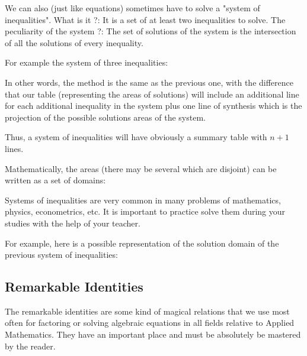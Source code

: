 	We can also (just like equations) sometimes have to solve a "system of inequalities". What is it ?: It is a set of at least two inequalities to solve. The peculiarity of the system ?: The set of solutions of the system is the intersection of all the solutions of every inequality.
	
	For example the system of three inequalities:
	
	In other words, the method is the same as the previous one, with the difference that our table (representing the areas of solutions) will include an additional line for each additional inequality in the system plus one line of synthesis which is the projection of the possible solutions areas of the system.
	
	Thus, a system of inequalities will have obviously a summary table with $n+1$ lines.
	
	Mathematically, the areas (there may be several which are disjoint) can be written as a set of domains:
	
	Systems of inequalities are very common in many problems of mathematics, physics, econometrics, etc. It is important to practice solve them during your studies with the help of your teacher.
	
	For example, here is a possible representation of the solution domain of the previous system of inequalities:
	\begin{center}
	\end{center}
	
	\subsection{Remarkable Identities}\label{calculus remarkable identities}
	The remarkable identities are some kind of magical relations that we use most often for factoring or solving algebraic equations in all fields relative to Applied Mathematics. They have an important place and must be absolutely be mastered by the reader.
	
